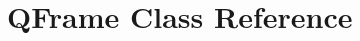 \hypertarget{classGUI_1_1Player_1_1QFrame}{}\section{Q\+Frame Class Reference}
\label{classGUI_1_1Player_1_1QFrame}
